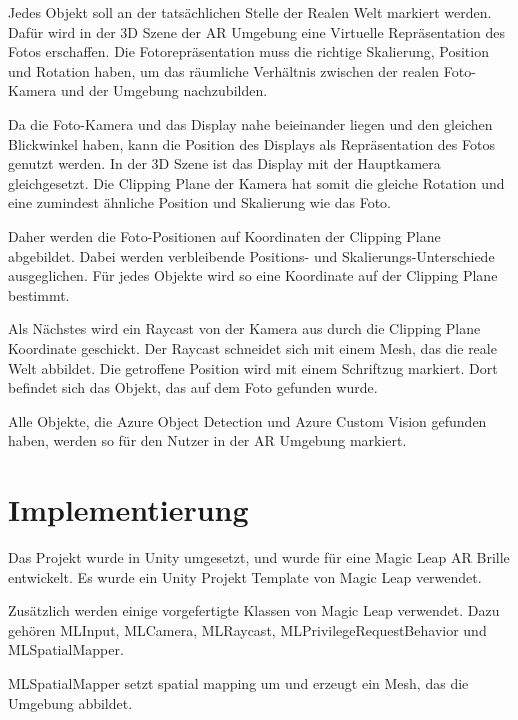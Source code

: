 \documentclass[german,a4paper, 12pt]{llncs}
\begin{document}
Jedes Objekt soll an der tatsächlichen Stelle der Realen Welt markiert werden.
Dafür wird in der 3D Szene der AR Umgebung eine Virtuelle Repräsentation des Fotos erschaffen. Die Fotorepräsentation muss die richtige Skalierung, Position und Rotation haben, um das räumliche Verhältnis zwischen der realen Foto-Kamera und der Umgebung nachzubilden.

Da die Foto-Kamera und das Display nahe beieinander liegen und den gleichen Blickwinkel haben, kann die Position des Displays als Repräsentation des Fotos genutzt werden. In der 3D Szene ist das Display mit der Hauptkamera gleichgesetzt. Die Clipping Plane der Kamera hat somit die gleiche Rotation und eine zumindest ähnliche Position und Skalierung wie das Foto. 

Daher werden die Foto-Positionen auf Koordinaten der Clipping Plane abgebildet. Dabei werden verbleibende Positions- und Skalierungs-Unterschiede ausgeglichen. Für jedes Objekte wird so eine Koordinate auf der Clipping Plane bestimmt. 

Als Nächstes wird ein Raycast von der Kamera aus durch die Clipping Plane Koordinate geschickt. Der Raycast schneidet sich mit einem Mesh, das die reale Welt abbildet. Die getroffene Position wird mit einem Schriftzug markiert. Dort befindet sich das Objekt, das auf dem Foto gefunden wurde.

Alle Objekte, die Azure Object Detection und Azure Custom Vision gefunden haben, werden so für den Nutzer in der AR Umgebung markiert.

\section{Implementierung}
Das Projekt wurde in Unity umgesetzt, und wurde für eine Magic Leap AR Brille entwickelt.
Es wurde ein Unity Projekt Template von Magic Leap verwendet. 

Zusätzlich werden einige vorgefertigte Klassen von Magic Leap verwendet. Dazu gehören MLInput, MLCamera, MLRaycast, MLPrivilegeRequestBehavior und MLSpatialMapper.

MLSpatialMapper setzt spatial mapping um und erzeugt ein Mesh, das die Umgebung abbildet.

\end{document}
